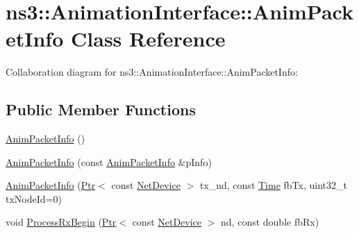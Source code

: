 \hypertarget{classns3_1_1AnimationInterface_1_1AnimPacketInfo}{}\section{ns3\+:\+:Animation\+Interface\+:\+:Anim\+Packet\+Info Class Reference}
\label{classns3_1_1AnimationInterface_1_1AnimPacketInfo}


Collaboration diagram for ns3\+:\+:Animation\+Interface\+:\+:Anim\+Packet\+Info\+:
\subsection*{Public Member Functions}
\begin{DoxyCompactItemize}
\item 
\hyperlink{classns3_1_1AnimationInterface_1_1AnimPacketInfo_a74d9d9d8a335cebedb862e395d1b0a88}{Anim\+Packet\+Info} ()
\item 
\hyperlink{classns3_1_1AnimationInterface_1_1AnimPacketInfo_a7f60b5e6509a4fb0e04b207db73812af}{Anim\+Packet\+Info} (const \hyperlink{classns3_1_1AnimationInterface_1_1AnimPacketInfo}{Anim\+Packet\+Info} \&p\+Info)
\item 
\hyperlink{classns3_1_1AnimationInterface_1_1AnimPacketInfo_a7a5419a355df3d210c12acaea15a3d03}{Anim\+Packet\+Info} (\hyperlink{classns3_1_1Ptr}{Ptr}$<$ const \hyperlink{classns3_1_1NetDevice}{Net\+Device} $>$ tx\+\_\+nd, const \hyperlink{classns3_1_1Time}{Time} fb\+Tx, uint32\+\_\+t tx\+Node\+Id=0)
\item 
void \hyperlink{classns3_1_1AnimationInterface_1_1AnimPacketInfo_a8f389c0575ccf723b45e7de4d4ff4cf0}{Process\+Rx\+Begin} (\hyperlink{classns3_1_1Ptr}{Ptr}$<$ const \hyperlink{classns3_1_1NetDevice}{Net\+Device} $>$ nd, const double fb\+Rx)
\end{DoxyCompactItemize}
